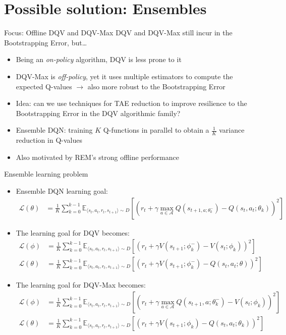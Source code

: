 \documentclass[presentation]{beamer}
\begin{document}
\section{Possible solution: Ensembles}
\label{sec:orgf6efc56}
\begin{frame}[label={sec:org2bfc36e}]{Focus: Offline DQV and DQV-Max}
DQV and DQV-Max still incur in the Bootstrapping Error, but\ldots{}
\begin{itemize}
\item Being an \emph{on-policy} algorithm, DQV is less prone to it
\item DQV-Max is \emph{off-policy}, yet it uses multiple estimators to compute
the expected Q-values \(\rightarrow\) also more robust to the
Bootstrapping Error
\item \alert{Idea}: can we use techniques for TAE reduction to improve resilience
to the Bootstrapping Error in the DQV algorithmic family?
\item Ensemble DQN\cite{anschel2017averaged}: training \(K\) Q-functions in
parallel to obtain a \(\frac{1}{K}\) variance reduction in Q-values
\item Also motivated by REM's strong offline performance
\end{itemize}
\end{frame}
\begin{frame}[label={sec:org692df91}]{Ensemble learning problem}
\fontsize{9pt}{10pt}\selectfont
\begin{itemize}
\item Ensemble DQN learning goal:
\begin{align}
\mathcal{L}(\theta) &= \frac{1}{K}\sum_{k=0}^{k-1}\mathbb{E}_{\langle s_t, a_t, r_t, s_{t+1} \rangle \sim D}\left[(r_t + \gamma \max_{a\in\mathcal{A}}Q(s_{t+1,a;\theta_{k}^{-}}) - Q(s_t, a_t;\theta_{k}))^2\right]
\end{align}
\item The learning goal for DQV becomes:
\begin{align}
\mathcal{L}(\phi) &= \frac{1}{K}\sum_{k=0}^{k-1}\mathbb{E}_{\langle s_t, a_t, r_t, s_{t+1} \rangle \sim D}\left[(r_t + \gamma V(s_{t+1};\phi_{k}^{-}) - V(s_t;\phi_{k}))^2\right] \\
\mathcal{L}(\theta) &= \frac{1}{K}\sum_{k=0}^{k-1}\mathbb{E}_{\langle s_t, a_t, r_t, s_{t+1} \rangle \sim D}\left[(r_t + \gamma V(s_{t+1};\phi_{k}^{-}) - Q(s_t, a_t;\theta))^2\right]
\end{align}
\item The learning goal for DQV-Max becomes:
\begin{align}
\label{eq:org093b6f2}
\mathcal{L}(\phi) &= \frac{1}{K}\sum_{k=0}^{k-1}\mathbb{E}_{\langle s_t, a_t, r_t, s_{t+1} \rangle \sim D}\left[(r_t + \gamma \max_{a\in\mathcal{A}}Q(s_{t+1},a;\theta_{k}^{-}) - V(s_t;\phi_{k}))^2\right] \\
\mathcal{L}(\theta) &= \frac{1}{K}\sum_{k=0}^{k-1}\mathbb{E}_{\langle s_t, a_t, r_t, s_{t+1} \rangle \sim D}\left[(r_t + \gamma V(s_{t+1};\phi_{k}) - Q(s_t, a_t;\theta_{k}))^2\right]
\end{align}
\end{itemize}
\end{frame}
\end{document}
